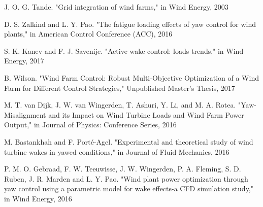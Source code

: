\documentclass[twoside,twocolumn]{article}
\begin{document}
	\begin{thebibliography}{99} %

J. O. G. Tande. "Grid integration of wind farms," in Wind Energy, 2003

 D. S. Zalkind and L. Y. Pao. "The fatigue loading effects of yaw control for wind plants," in American Control Conference (ACC), 2016

S. K. Kanev and F. J. Savenije. "Active wake control: loads trends," in Wind Energy, 2017

B. Wilson. "Wind Farm Control: Robust Multi-Objective Optimization of a Wind Farm for Different Control Strategies," Unpublished Master's Thesis, 2017

M. T. van Dijk, J. W. van Wingerden, T. Ashuri, Y. Li, and M. A. Rotea. "Yaw-Misalignment and its Impact on Wind Turbine Loads and Wind Farm Power Output," in Journal of Physics: Conference Series, 2016

M. Bastankhah and F. Porté-Agel. "Experimental and theoretical study of wind turbine wakes in yawed conditions," in Journal of Fluid Mechanics, 2016

P. M. O. Gebraad, F. W. Teeuwisse, J. W. Wingerden, P. A. Fleming, S. D. Ruben, J. R. Marden and L. Y. Pao. "Wind plant power optimization through yaw control using a parametric model for wake effects-a CFD simulation study," in Wind Energy, 2016

		
	\end{thebibliography}
	
	
\end{document}
